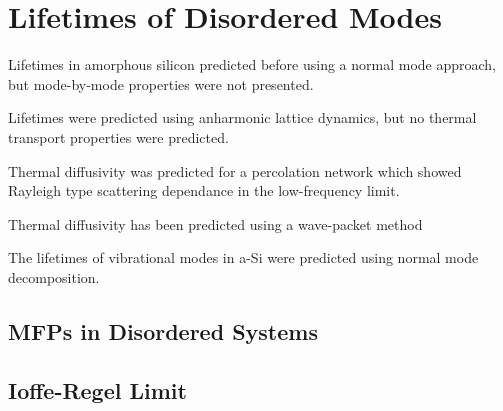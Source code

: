 \documentclass[aps,prb,preprint,superscriptaddress,amsmath,amssymb,floatfix]{revtex4}
\begin{document}
\section{\label{S:Lifetimes}Lifetimes of Disordered Modes}
Lifetimes in amorphous silicon predicted before using a normal mode 
approach, but mode-by-mode properties were not presented.
\cite{bickham_calculation_1998}

Lifetimes were predicted using anharmonic lattice dynamics, but no thermal 
transport properties were predicted.\cite{fabian_anharmonic_1996}

Thermal diffusivity was predicted for a percolation network which showed 
Rayleigh type scattering dependance in the low-frequency limit.
\cite{sheng_heat_1991}

Thermal diffusivity has been predicted using a wave-packet method

The lifetimes of vibrational modes in a-Si were predicted using normal 
mode decomposition.\cite{he_heat_2011}

\subsection{\label{S:Lifetimes:}MFPs in Disordered Systems}


\vspace*{100mm}

\subsection{\label{S:Lifetimes:}Ioffe-Regel Limit}
\end{document}
